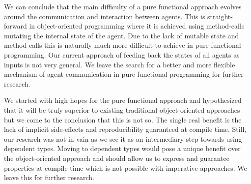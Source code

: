 We can conclude that the main difficulty of a pure functional approach evolves around the communication and interaction between agents. This is straight-forward in object-oriented programming where it is achieved using method-calls mutating the internal state of the agent. Due to the lack of mutable state and method calls this is naturally much more difficult to achieve in pure functional programming. Our current approach of feeding back the states of all agents as inputs is not very general. We leave the search for a better and more flexible mechanism of agent communication in pure functional programming for further research.

\begin{comment}
Our current solution to the problem is the data-flow mechanism as implemented in section \ref{sec:step3_dataflow}. We have to admit that it is rather ad-hoc and may need some refinement and generalisation, also it is unclear if there are not better/more flexible mechanisms of agent communication and interaction in pure functional programming. We leave this for further research.
\end{comment}

We started with high hopes for the pure functional approach and hypothesized that it will be truly superior to existing traditional object-oriented approaches but we come to the conclusion that this is not so. The single real benefit is the lack of implicit side-effects and reproducibility guaranteed at compile time. Still, our research was not in vain as we see it as an intermediary step towards using dependent types. Moving to dependent types would pose a unique benefit over the object-oriented approach and should allow us to express and guarantee properties at compile time which is not possible with imperative approaches. We leave this for further research.
